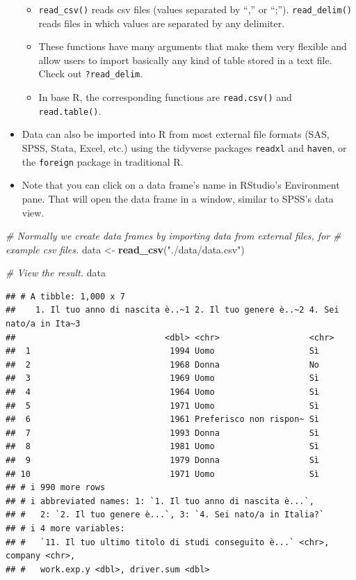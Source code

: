 \documentclass[
]{book}
\newenvironment{Shaded}{\begin{snugshade}}{\end{snugshade}}
\newcommand{\CommentTok}[1]{\textcolor[rgb]{0.56,0.35,0.01}{\textit{#1}}}
\newcommand{\FunctionTok}[1]{\textcolor[rgb]{0.13,0.29,0.53}{\textbf{#1}}}
\newcommand{\NormalTok}[1]{#1}
\newcommand{\OtherTok}[1]{\textcolor[rgb]{0.56,0.35,0.01}{#1}}
\newcommand{\StringTok}[1]{\textcolor[rgb]{0.31,0.60,0.02}{#1}}
\providecommand{\tightlist}{%
  \setlength{\itemsep}{0pt}\setlength{\parskip}{0pt}}
\begin{document}
\begin{itemize}
  \begin{itemize}
  \tightlist
  \item
    \texttt{read\_csv()} reads csv files (values separated by ``,'' or ``;''). \texttt{read\_delim()} reads files in which values are separated by any delimiter.
  \item
    These functions have many arguments that make them very flexible and allow users to import basically any kind of table stored in a text file. Check out \texttt{?read\_delim}.
  \item
    In base R, the corresponding functions are \texttt{read.csv()} and \texttt{read.table()}.
  \end{itemize}
\item
  Data can also be imported into R from most external file formats (SAS, SPSS, Stata, Excel, etc.) using the tidyverse packages \texttt{readxl} and \texttt{haven}, or the \texttt{foreign} package in traditional R.
\item
  Note that you can click on a data frame's name in RStudio's Environment pane. That will open the data frame in a window, similar to SPSS's data view.
\end{itemize}

\begin{Shaded}
\begin{Highlighting}[]
\CommentTok{\# Normally we create data frames by importing data from external files, for}
\CommentTok{\# example csv files.}
\NormalTok{data }\OtherTok{\textless{}{-}} \FunctionTok{read\_csv}\NormalTok{(}\StringTok{"./data/data.csv"}\NormalTok{)}

\CommentTok{\# View the result.}
\NormalTok{data}
\end{Highlighting}
\end{Shaded}

\begin{verbatim}
## # A tibble: 1,000 x 7
##    1. Il tuo anno di nascita è..~1 2. Il tuo genere è..~2 4. Sei nato/a in Ita~3
##                              <dbl> <chr>                  <chr>                 
##  1                            1994 Uomo                   Sì                    
##  2                            1968 Donna                  No                    
##  3                            1969 Uomo                   Sì                    
##  4                            1964 Uomo                   Sì                    
##  5                            1971 Uomo                   Sì                    
##  6                            1961 Preferisco non rispon~ Sì                    
##  7                            1993 Donna                  Sì                    
##  8                            1981 Uomo                   Sì                    
##  9                            1979 Donna                  Sì                    
## 10                            1971 Uomo                   Sì                    
## # i 990 more rows
## # i abbreviated names: 1: `1. Il tuo anno di nascita è...`,
## #   2: `2. Il tuo genere è...`, 3: `4. Sei nato/a in Italia?`
## # i 4 more variables:
## #   `11. Il tuo ultimo titolo di studi conseguito è...` <chr>, company <chr>,
## #   work.exp.y <dbl>, driver.sum <dbl>
\end{verbatim}
\end{document}
